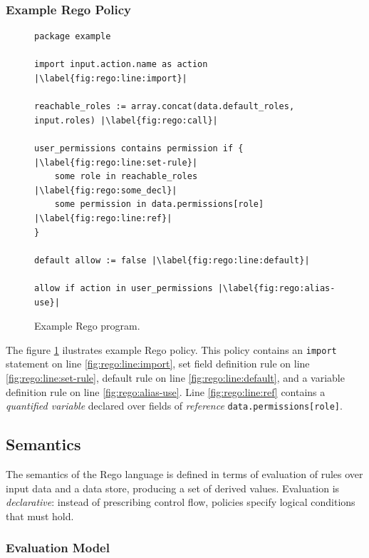 \subsubsection{Example Rego Policy}

\begin{figure}
  \label{fig:rego}
  \begin{lstlisting}[language=Rego,escapechar=|]
package example

import input.action.name as action |\label{fig:rego:line:import}|

reachable_roles := array.concat(data.default_roles, input.roles) |\label{fig:rego:call}|

user_permissions contains permission if { |\label{fig:rego:line:set-rule}|
	some role in reachable_roles |\label{fig:rego:some_decl}|
	some permission in data.permissions[role] |\label{fig:rego:line:ref}|
}

default allow := false |\label{fig:rego:line:default}|

allow if action in user_permissions |\label{fig:rego:alias-use}|
\end{lstlisting}
  \caption{Example Rego program.}
\end{figure}

The figure \ref{fig:rego} ilustrates example Rego policy.
This policy contains an \texttt{import} statement on line \ref{fig:rego:line:import}, set field definition rule on line \ref{fig:rego:line:set-rule}, default rule on line \ref{fig:rego:line:default}, and a variable definition rule on line \ref{fig:rego:alias-use}.
Line \ref{fig:rego:line:ref} contains a \emph{quantified variable} declared over fields of \emph{reference} \texttt{data.permissions[role]}.

\subsection{Semantics}


The semantics of the Rego language is defined in terms of evaluation of rules over input data and a data store, producing a set of derived values. Evaluation is \emph{declarative}: instead of prescribing control flow, policies specify logical conditions that must hold.


\subsubsection{Evaluation Model}

